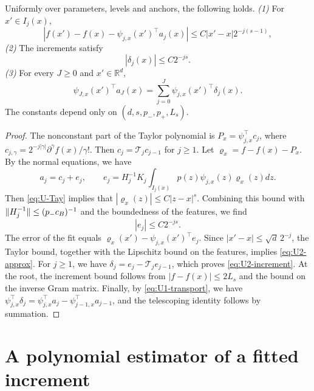 \begin{lemma}\label{lem:U2}
Uniformly over parameters, levels and anchors, the following holds.
\emph{(1)} For $x'\in I_j(x)$,
\begin{equation}\label{eq:U2-approx}
 |f(x')-f(x)-\psi_{j,x}(x')^\top a_j(x)|
 \le C|x'-x|2^{-j(s-1)},
\end{equation}
\emph{(2)} The increments satisfy
\begin{equation}\label{eq:U2-increment}
 |\delta_j(x)|\le C2^{-js}.
\end{equation}
\emph{(3)} For every $J\ge0$ and $x'\in\mathbb R^d$,
\begin{equation}\label{eq:U2-telescope}
 \psi_{J,x}(x')^\top a_J(x)
 =\sum_{j=0}^J\psi_{j,x}(x')^\top\delta_j(x).
\end{equation}
The constants depend only on $(d,s,p_-,p_+,L_s)$.
\end{lemma}

\begin{proof}
The nonconstant part of the Taylor polynomial is
$P_x=\psi_{j,x}^\top c_j$, where
$c_{j,\gamma}=2^{-j|\gamma|}\partial^\gamma f(x)/\gamma!$.
Then $c_j=\mathcal T_jc_{j-1}$ for $j\ge1$. Let
$\varrho_x=f-f(x)-P_x$. By the normal equations, we have
\begin{equation}\label{eq:U2-ej}
 a_j=c_j+e_j,\qquad
 e_j=H_j^{-1}K_j\int_{I_j(x)}p(z)\psi_{j,x}(z)\varrho_x(z)dz.
\end{equation}
Then \eqref{eq:U-Tay} implies that $|\varrho_x(z)|\le C|z-x|^s$.
Combining this bound with $\lVert H_j^{-1}\rVert\le(p_-c_B)^{-1}$ and the
boundedness of the features, we find
\begin{equation}\label{eq:U2-ej-bound}
 |e_j|\le C2^{-js}.
\end{equation}
The error of the fit equals $\varrho_x(x')-\psi_{j,x}(x')^\top e_j$.
Since $|x'-x|\le\sqrt d\,2^{-j}$, the Taylor bound, together with the
Lipschitz bound on the features, implies \eqref{eq:U2-approx}.
For $j\ge1$, we have $\delta_j=e_j-\mathcal T_je_{j-1}$, which proves
\eqref{eq:U2-increment}. At the root, the increment bound follows from
$|f-f(x)|\le2L_s$ and the bound on the inverse Gram matrix.
Finally, by \eqref{eq:U1-transport}, we have
$\psi_{j,x}^\top\delta_j=\psi_{j,x}^\top a_j-
\psi_{j-1,x}^\top a_{j-1}$, and the telescoping identity follows by
summation.
\end{proof}
\section{A polynomial estimator of a fitted increment}\label{sec:U-inverse}

